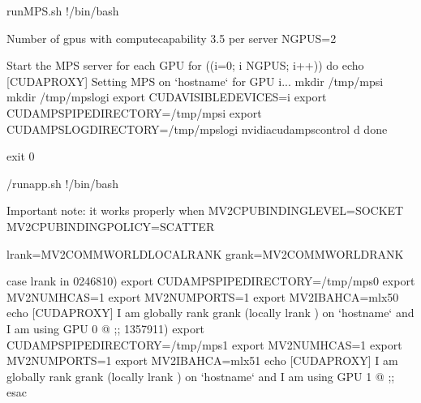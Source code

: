 \documentclass[letterpaper,10pt,english]{sphinxmanual}
\begin{document}
%
\begin{sphinxVerbatim}[commandchars=\\\{\}]
\PYGZsh{}\PYGZsh{}\PYGZsh{}\PYGZsh{}\PYGZsh{}run\PYGZus{}MPS.sh
\PYGZsh{}!/bin/bash

\PYGZsh{} Number of gpus with compute\PYGZus{}capability 3.5  per server
NGPUS=2

\PYGZsh{} Start the MPS server for each GPU
for ((i=0; i\PYGZlt{} \PYGZdl{}NGPUS; i++))
do
 echo \PYGZdq{}[CUDA\PYGZhy{}PROXY] Setting MPS on {}`hostname{}` for GPU \PYGZdl{}i...\PYGZdq{}
 mkdir /tmp/mps\PYGZus{}\PYGZdl{}i
 mkdir /tmp/mps\PYGZus{}log\PYGZus{}\PYGZdl{}i
 export CUDA\PYGZus{}VISIBLE\PYGZus{}DEVICES=\PYGZdl{}i
 export CUDA\PYGZus{}MPS\PYGZus{}PIPE\PYGZus{}DIRECTORY=/tmp/mps\PYGZus{}\PYGZdl{}i
 export CUDA\PYGZus{}MPS\PYGZus{}LOG\PYGZus{}DIRECTORY=/tmp/mps\PYGZus{}log\PYGZus{}\PYGZdl{}i
 nvidia\PYGZhy{}cuda\PYGZhy{}mps\PYGZhy{}control \PYGZhy{}d
done

exit 0
\end{sphinxVerbatim}

%
\begin{sphinxVerbatim}[commandchars=\\\{\}]
\PYGZsh{}\PYGZsh{}\PYGZsh{}/run\PYGZus{}app.sh
\PYGZsh{}!/bin/bash

\PYGZsh{} Important note: it works properly when MV2\PYGZus{}CPU\PYGZus{}BINDING\PYGZus{}LEVEL=SOCKET \PYGZam{}\PYGZam{}
\PYGZsh{} MV2\PYGZus{}CPU\PYGZus{}BINDING\PYGZus{}POLICY=SCATTER

lrank=\PYGZdl{}MV2\PYGZus{}COMM\PYGZus{}WORLD\PYGZus{}LOCAL\PYGZus{}RANK
grank=\PYGZdl{}MV2\PYGZus{}COMM\PYGZus{}WORLD\PYGZus{}RANK

case \PYGZdl{}\PYGZob{}lrank\PYGZcb{} in
0\textbar{}2\textbar{}4\textbar{}6\textbar{}8\textbar{}10)
  export CUDA\PYGZus{}MPS\PYGZus{}PIPE\PYGZus{}DIRECTORY=/tmp/mps\PYGZus{}0
  export MV2\PYGZus{}NUM\PYGZus{}HCAS=1
  export MV2\PYGZus{}NUM\PYGZus{}PORTS=1
  export MV2\PYGZus{}IBA\PYGZus{}HCA=mlx5\PYGZus{}0
  echo \PYGZdq{}[CUDA\PYGZhy{}PROXY] I am globally rank \PYGZdl{}grank (locally \PYGZdl{}lrank ) on \PYGZbs{}
  {}`hostname{}` and I am using GPU 0\PYGZdq{}
  \PYGZdq{}\PYGZdl{}@\PYGZdq{}
  ;;
1\textbar{}3\textbar{}5\textbar{}7\textbar{}9\textbar{}11)
  export CUDA\PYGZus{}MPS\PYGZus{}PIPE\PYGZus{}DIRECTORY=/tmp/mps\PYGZus{}1
  export MV2\PYGZus{}NUM\PYGZus{}HCAS=1
  export MV2\PYGZus{}NUM\PYGZus{}PORTS=1
  export MV2\PYGZus{}IBA\PYGZus{}HCA=mlx5\PYGZus{}1
  echo \PYGZdq{}[CUDA\PYGZhy{}PROXY] I am globally rank \PYGZdl{}grank (locally \PYGZdl{}lrank ) on \PYGZbs{}
  {}`hostname{}` and I am using GPU 1\PYGZdq{}
  \PYGZdq{}\PYGZdl{}@\PYGZdq{}
  ;;
esac
\end{sphinxVerbatim}
\end{document}
